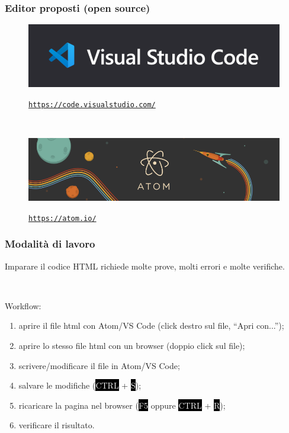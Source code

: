 \documentclass[]{beamer}
\begin{document}
\begin{frame}
\frametitle{Editor proposti (open source)}
\begin{figure}
\includegraphics[width=.7\columnwidth]{screenshots/vscode.png}

\href{https://code.visualstudio.com/download}{\texttt{https://code.visualstudio.com/}}
\end{figure}

~

\begin{figure}
\includegraphics[width=.7\columnwidth]{screenshots/atom.png}

\href{https://atom.io/}{\texttt{https://atom.io/}}
\end{figure}
\end{frame}


\begin{frame}
\frametitle{Modalità di lavoro}
Imparare il codice HTML richiede molte prove, molti errori e molte verifiche.\pause

~

Workflow:
\begin{enumerate}
  \item aprire il file html con Atom/VS Code (click destro sul file, ``Apri con...'');\pause
  \item aprire lo stesso file html con un browser (doppio click sul file);\pause
  \item scrivere/modificare il file in Atom/VS Code;\pause
  \item salvare le modifiche (\colorbox{black}{\textcolor{white}{CTRL}} + \colorbox{black}{\textcolor{white}{S}});\pause
  \item ricaricare la pagina nel browser (\colorbox{black}{\textcolor{white}{F5}} oppure \colorbox{black}{\textcolor{white}{CTRL}} + \colorbox{black}{\textcolor{white}{R}});\pause
  \item verificare il risultato.
\end{enumerate}
\end{frame}
\end{document}
